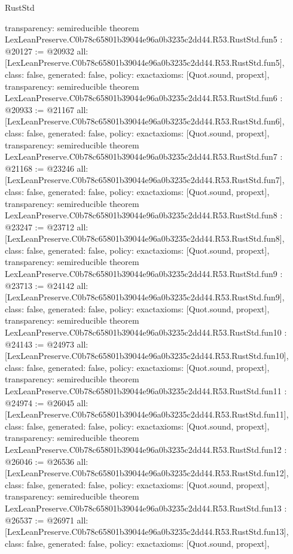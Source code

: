 \begin{lexlean}{RustStd}
\begin{coremodule}
{  transparency: semireducible
}
theorem LexLeanPreserve.C0b78c65801b39044e96a0b3235c2dd44.R53.RustStd.fun5 : @20127 := @20932 {
  all: [LexLeanPreserve.C0b78c65801b39044e96a0b3235c2dd44.R53.RustStd.fun5],
  class: false,
  generated: false,
  policy: exact{axioms: [Quot.sound, propext]},
  transparency: semireducible
}
theorem LexLeanPreserve.C0b78c65801b39044e96a0b3235c2dd44.R53.RustStd.fun6 : @20933 := @21167 {
  all: [LexLeanPreserve.C0b78c65801b39044e96a0b3235c2dd44.R53.RustStd.fun6],
  class: false,
  generated: false,
  policy: exact{axioms: [Quot.sound, propext]},
  transparency: semireducible
}
theorem LexLeanPreserve.C0b78c65801b39044e96a0b3235c2dd44.R53.RustStd.fun7 : @21168 := @23246 {
  all: [LexLeanPreserve.C0b78c65801b39044e96a0b3235c2dd44.R53.RustStd.fun7],
  class: false,
  generated: false,
  policy: exact{axioms: [Quot.sound, propext]},
  transparency: semireducible
}
theorem LexLeanPreserve.C0b78c65801b39044e96a0b3235c2dd44.R53.RustStd.fun8 : @23247 := @23712 {
  all: [LexLeanPreserve.C0b78c65801b39044e96a0b3235c2dd44.R53.RustStd.fun8],
  class: false,
  generated: false,
  policy: exact{axioms: [Quot.sound, propext]},
  transparency: semireducible
}
theorem LexLeanPreserve.C0b78c65801b39044e96a0b3235c2dd44.R53.RustStd.fun9 : @23713 := @24142 {
  all: [LexLeanPreserve.C0b78c65801b39044e96a0b3235c2dd44.R53.RustStd.fun9],
  class: false,
  generated: false,
  policy: exact{axioms: [Quot.sound, propext]},
  transparency: semireducible
}
theorem LexLeanPreserve.C0b78c65801b39044e96a0b3235c2dd44.R53.RustStd.fun10 : @24143 := @24973 {
  all: [LexLeanPreserve.C0b78c65801b39044e96a0b3235c2dd44.R53.RustStd.fun10],
  class: false,
  generated: false,
  policy: exact{axioms: [Quot.sound, propext]},
  transparency: semireducible
}
theorem LexLeanPreserve.C0b78c65801b39044e96a0b3235c2dd44.R53.RustStd.fun11 : @24974 := @26045 {
  all: [LexLeanPreserve.C0b78c65801b39044e96a0b3235c2dd44.R53.RustStd.fun11],
  class: false,
  generated: false,
  policy: exact{axioms: [Quot.sound, propext]},
  transparency: semireducible
}
theorem LexLeanPreserve.C0b78c65801b39044e96a0b3235c2dd44.R53.RustStd.fun12 : @26046 := @26536 {
  all: [LexLeanPreserve.C0b78c65801b39044e96a0b3235c2dd44.R53.RustStd.fun12],
  class: false,
  generated: false,
  policy: exact{axioms: [Quot.sound, propext]},
  transparency: semireducible
}
theorem LexLeanPreserve.C0b78c65801b39044e96a0b3235c2dd44.R53.RustStd.fun13 : @26537 := @26971 {
  all: [LexLeanPreserve.C0b78c65801b39044e96a0b3235c2dd44.R53.RustStd.fun13],
  class: false,
  generated: false,
  policy: exact{axioms: [Quot.sound, propext]},
}
\end{coremodule}
\end{lexlean}
